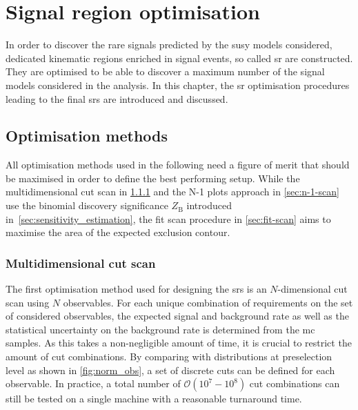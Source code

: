 

\chapter{Signal region optimisation}

\ifpdf
    \graphicspath{{chapter-optimisation/Figs/Raster/}{chapter-optimisation/Figs/PDF/}{chapter-optimisation/Figs/}}
\else
    \graphicspath{{chapter-optimisation/Figs/Vector/}{chapter-optimisation/Figs/}}
\fi


In order to discover the rare signals predicted by the \gls{susy} models considered, dedicated kinematic regions enriched in signal events, so called \gls{sr} are constructed. They are optimised to be able to discover a maximum number of the signal models considered in the analysis. In this chapter, the \gls{sr} optimisation procedures leading to the final \glspl{sr} are introduced and discussed. 

\section{Optimisation methods}

All optimisation methods used in the following need a figure of merit that should be maximised in order to define the best performing setup. While the multidimensional cut scan in \cref{sec:n-dim-scan} and the N-1 plots approach in \cref{sec:n-1-scan} use the binomial discovery significance $Z_\mathrm{B}$ introduced in~\cref{sec:sensitivity_estimation}, the fit scan procedure in \cref{sec:fit-scan} aims to maximise the area of the expected exclusion contour.

\subsection{Multidimensional cut scan}\label{sec:n-dim-scan}

The first optimisation method used for designing the \glspl{sr} is an $N$-dimensional cut scan using $N$ observables. For each unique combination of requirements on the set of considered observables, the expected signal and background rate as well as the statistical uncertainty on the background rate is determined from the \gls{mc} samples. As this takes a non-negligible amount of time, it is crucial to restrict the amount of cut combinations. By comparing with distributions at preselection level as \eg shown in \cref{fig:norm_obs}, a set of discrete cuts can be defined for each observable. In practice, a total number of $\mathcal{O}(10^7-10^8)$ cut combinations can still be tested on a single machine with a reasonable turnaround time. 

